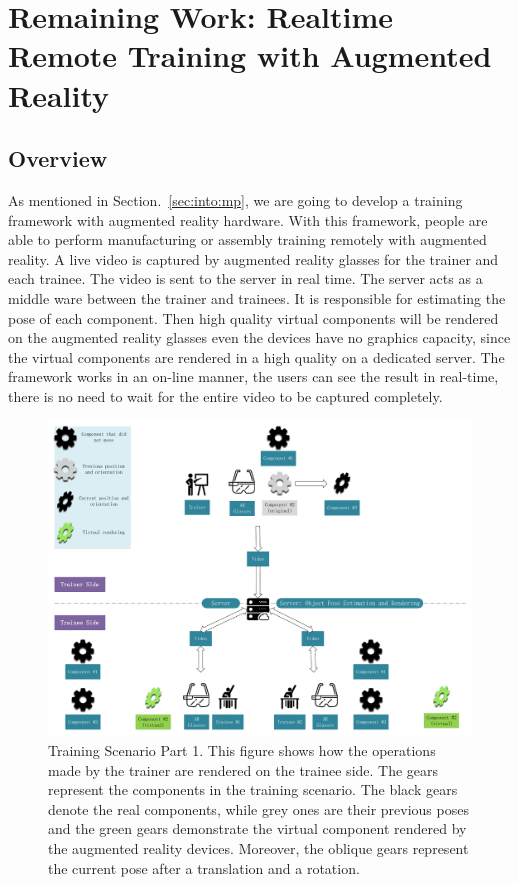 \chapter{Remaining Work: Realtime Remote Training with Augmented Reality}
\label{chap:rrtar}

\section{Overview}

As mentioned in Section.~\ref{sec:into:mp}, we are going to develop a training framework with augmented reality hardware. With this framework, people are able to perform manufacturing or assembly training remotely with augmented reality.
A live video is captured by augmented reality glasses for the trainer and each trainee. The video is sent to the server in real time. The server acts as a middle ware between the trainer and trainees. It is responsible for estimating the pose of each component.
Then high quality virtual components will be rendered on the augmented reality glasses even the devices have no graphics capacity, since the virtual components are rendered in a high quality on a dedicated server. The framework works in an on-line manner, the users can see the result in real-time, there is no need to wait for the entire video to be captured completely.

\begin{figure}
	\centering
	\includegraphics[width=\textwidth]{figures/scenario1.pdf}
	\caption{Training Scenario Part 1. This figure shows how the operations made by the trainer are rendered on the trainee side. The gears represent the components in the training scenario. The black gears denote the real components, while grey ones are their previous poses and the green gears demonstrate the virtual component rendered by the augmented reality devices. Moreover, the oblique gears represent the current pose after a translation and a rotation.}
	\label{fig-scenario1}
\end{figure}

